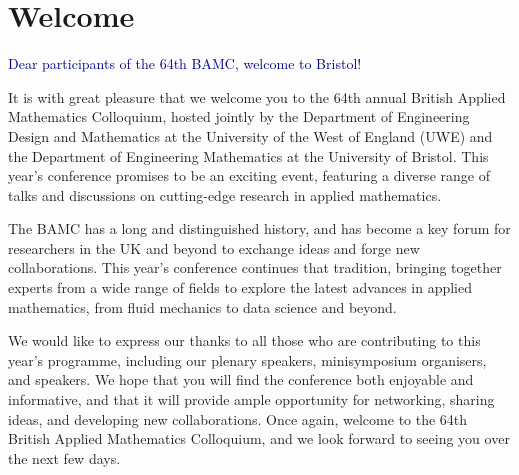 \documentclass[12pt,a4paper]{article}
\begin{document}

\setcounter{page}{1}

\section{Welcome}

\thispagestyle{empty}


\textcolor{DarkBlue}{\large Dear participants of the 64th BAMC, welcome to Bristol!}

It is with great pleasure that we welcome you to the 64th annual British Applied Mathematics Colloquium, hosted jointly by the Department of Engineering Design and Mathematics at the University of the West of England (UWE) and the Department of Engineering Mathematics at the University of Bristol. This year's conference promises to be an exciting event, featuring a diverse range of talks and discussions on cutting-edge research in applied mathematics.

The BAMC has a long and distinguished history, and has become a key forum for researchers in the UK and beyond to exchange ideas and forge new collaborations. This year's conference continues that tradition, bringing together experts from a wide range of fields to explore the latest advances in applied mathematics, from fluid mechanics to data science and beyond.

We would like to express our thanks to all those who are contributing to this year's programme, including our plenary speakers, minisymposium organisers, and speakers. We hope that you will find the conference both enjoyable and informative, and that it will provide ample opportunity for networking, sharing ideas, and developing new collaborations. Once again, welcome to the 64th British Applied Mathematics Colloquium, and we look forward to seeing you over the next few days.
\end{document}

